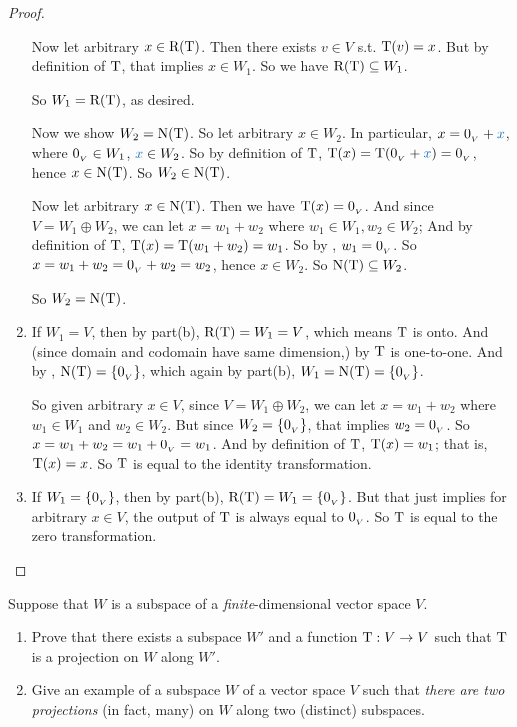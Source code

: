 \begin{proof}
\begin{enumerate}
Now let arbitrary \(x \in \mathrm{R(T)}\).
Then there exists \(v \in V\) s.t. \(\mathrm{T}(v) = x\).
But by definition of \(\mathrm{T}\), that implies \(x \in W_1\).
So we have \(\mathrm{R(T)} \subseteq W_1\).

So \(W_1 = \mathrm{R(T)}\), as desired.

Now we show \(W_2 = \mathrm{N(T)}\).
So let arbitrary \(x \in W_2\).
In particular, \(x = \OV + \BLUE{x}\), where \(0_{_V} \in W_1\), \(\BLUE{x} \in W_2\).
So by definition of \(\mathrm{T}\), \(\T(x) = \T(\OV + \BLUE{x}) = \OV\), hence \(x \in \mathrm{N(T)}\).
So \(W_2 \in \mathrm{N(T)}\).

Now let arbitrary \(x \in \mathrm{N(T)}\).
Then we have \(\mathrm{T}(x) = 0_{_V}\). 
And since \(V = W_1 \oplus W_2\), we can let \(x = w_1 + w_2\) where \(w_1 \in W_1, w_2 \in W_2\);
And by definition of \(\mathrm{T}\), \(\mathrm{T}(x) = \mathrm{T}(w_1 + w_2) = w_1\).
So by , \(w_1 = 0_{_V}\).
So \(x = w_1 + w_2 = 0_{_V} + w_2 = w_2\), hence \(x \in W_2\).
So \(\mathrm{N(T)} \subseteq W_2\).

So \(W_2 = \mathrm{N(T)}\).

\item
If \(W_1 = V\), then by part(b), \(\mathrm{R(T)} = W_1 = V\), which means \(\mathrm{T}\) is onto.
And (since domain and codomain have same dimension,) by  \(\mathrm{T}\) is one-to-one.
And by , \(\mathrm{N(T)} = \{ 0_{_V} \}\), which again by part(b), \(W_1 = \mathrm{N(T)} = \{ 0_{_V} \}\).

So given arbitrary \(x \in V\), since \(V = W_1 \oplus W_2\), we can let \(x = w_1 + w_2\) where \(w_1 \in W_1\) and \(w_2 \in W_2\).
But since \(W_2 = \{ 0_{_V} \}\), that implies \(w_2 = 0_{_V}\).
So \(x = w_1 + w_2 = w_1 + 0_{_V} = w_1\).
And by definition of \(\mathrm{T}\), \(\mathrm{T}(x) = w_1\);
that is, \(\mathrm{T}(x) = x\).
So \(\mathrm{T}\) is equal to the identity transformation.

\item
If \(W_1 = \{ 0_{_V} \}\), then by part(b), \(\mathrm{R(T)} = W_1 = \{ 0_{_V} \}\).
But that just implies for arbitrary \(x \in V\), the output of \(\mathrm{T}\) is always equal to \(0_{_V}\).
So \(\mathrm{T}\) is equal to the zero transformation.
\end{enumerate}
\end{proof}

\begin{exercise} \label{exercise 2.1.28}
Suppose that \(W\) is a subspace of a \emph{finite}-dimensional vector space \(V\).
\begin{enumerate}
\item Prove that there exists a subspace \(W'\) and a function \(\mathrm{T} : V \to V\) such that \(\mathrm{T}\) is a projection on \(W\) along \(W'\).
\item Give an example of a subspace \(W\) of a vector space \(V\) such that \emph{there are two projections} (in fact, many) on \(W\) along two (distinct) subspaces.
\end{enumerate}
\end{exercise}

